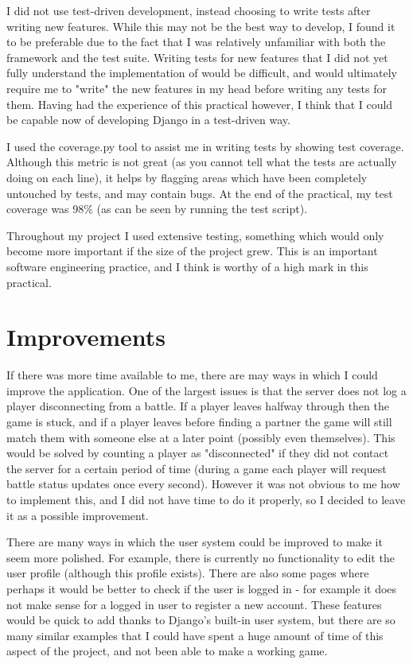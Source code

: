 \documentclass{article}
\begin{document}
I did not use test-driven development, instead choosing to write tests after writing new features. While this may not be the best way to develop, I found it to be preferable due to the fact that I was relatively unfamiliar with both the framework and the test suite. Writing tests for new features that I did not yet fully understand the implementation of would be difficult, and would ultimately require me to "write" the new features in my head before writing any tests for them. Having had the experience of this practical however, I think that I could be capable now of developing Django in a test-driven way.

I used the coverage.py tool to assist me in writing tests by showing test coverage. Although this metric is not great (as you cannot tell what the tests are actually doing on each line), it helps by flagging areas which have been completely untouched by tests, and may contain bugs. At the end of the practical, my test coverage was 98\% (as can be seen by running the test script).

Throughout my project I used extensive testing, something which would only become more important if the size of the project grew. This is an important software engineering practice, and I think is worthy of a high mark in this practical.

\section{Improvements}

If there was more time available to me, there are may ways in which I could improve the application. One of the largest issues is that the server does not log a player disconnecting from a battle. If a player leaves halfway through then the game is stuck, and if a player leaves before finding a partner the game will still match them with someone else at a later point (possibly even themselves). This would be solved by counting a player as "disconnected" if they did not contact the server for a certain period of time (during a game each player will  request battle status updates once every second). However it was not obvious to me how to implement this, and I did not have time to do it properly, so I decided to leave it as a possible improvement.

There are many ways in which the user system could be improved to make it seem more polished. For example, there is currently no functionality to edit the user profile (although this profile exists). There are also some pages where perhaps it would be better to check if the user is logged in - for example it does not make sense for a logged in user to register a new account. These features would be quick to add thanks to Django's built-in user system, but there are so many similar examples that I could have spent a huge amount of time of this aspect of the project, and not been able to make a working game.
\end{document}
